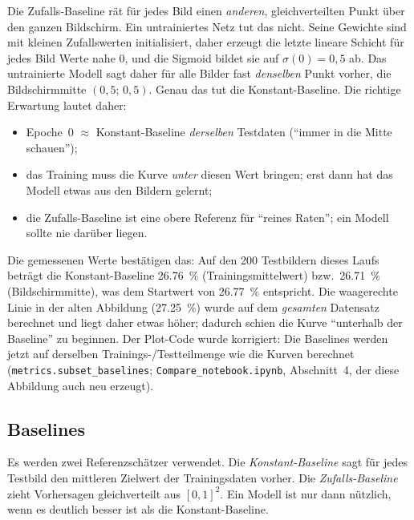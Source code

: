 \documentclass[
  11pt,
  a4paper,
  oneside,
  DIV=12,
  BCOR=8mm,
  parskip=half,
  headings=normal,
  bibliography=totoc,
  listof=totoc
]{scrreprt}
\newcommand{\code}[1]{\texttt{#1}}
\begin{document}
Die Zufalls-Baseline rät für jedes Bild einen \emph{anderen}, gleichverteilten
Punkt über den ganzen Bildschirm. Ein untrainiertes Netz tut das nicht.
Seine Gewichte sind mit kleinen Zufallswerten initialisiert, daher erzeugt
die letzte lineare Schicht für jedes Bild Werte nahe $0$, und die Sigmoid
bildet sie auf $\sigma(0)=0,5$ ab. Das untrainierte Modell sagt daher für
alle Bilder fast \emph{denselben} Punkt vorher, die Bildschirmmitte
$(0{,}5;\,0{,}5)$. Genau das tut die Konstant-Baseline. Die richtige
Erwartung lautet daher:
\begin{itemize}[nosep]
  \item Epoche~0 $\approx$ Konstant-Baseline \emph{derselben} Testdaten
        (\enquote{immer in die Mitte schauen});
  \item das Training muss die Kurve \emph{unter} diesen Wert bringen; erst
        dann hat das Modell etwas aus den Bildern gelernt;
  \item die Zufalls-Baseline ist eine obere Referenz für \enquote{reines
        Raten}; ein Modell sollte nie darüber liegen.
\end{itemize}
Die gemessenen Werte bestätigen das: Auf den 200 Testbildern dieses Laufs
beträgt die Konstant-Baseline \SI{26,76}{\percent} (Trainingsmittelwert) bzw.\
\SI{26,71}{\percent} (Bildschirmmitte), was dem Startwert von
\SI{26,77}{\percent} entspricht. Die waagerechte Linie in der alten Abbildung
(\SI{27,25}{\percent}) wurde auf dem \emph{gesamten} Datensatz berechnet und
liegt daher etwas höher; dadurch schien die Kurve \enquote{unterhalb der
Baseline} zu beginnen. Der Plot-Code wurde korrigiert: Die Baselines werden
jetzt auf derselben Trainings-/Testteilmenge wie die Kurven berechnet
(\code{metrics.subset\_baselines}; \code{Compare\_notebook.ipynb},
Abschnitt~4, der diese Abbildung auch neu erzeugt).

\subsection{Baselines}
\label{sec:baselines}

Es werden zwei Referenzschätzer verwendet. Die \emph{Konstant-Baseline} sagt
für jedes Testbild den mittleren Zielwert der Trainingsdaten vorher. Die
\emph{Zufalls-Baseline} zieht Vorhersagen gleichverteilt aus $[0,1]^2$. Ein
Modell ist nur dann nützlich, wenn es deutlich besser ist als die
Konstant-Baseline.
\end{document}
